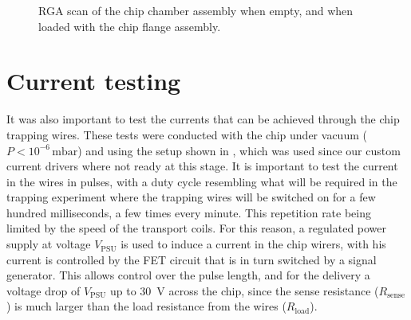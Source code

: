   \begin{figure}[htb]
  \centering
  \caption[RGA scan of empty and full chambers]{
    RGA scan of the chip chamber assembly when empty, and when loaded with the
  chip flange assembly.}
  \label{exper:fig:rga}
\end{figure}


\section{Current testing}
\label{exper:current}

It was also important to test the currents that can be achieved through the
chip trapping wires. These tests were conducted with the chip under vacuum
($P<10^{-6}\,\si{\milli\bar}$) and using the setup shown in
, which was used since our custom current drivers
where not ready at this stage. It is important to test the current in the wires
in pulses, with a duty cycle resembling what will be required in the trapping
experiment where the trapping wires will be switched on for a few hundred
milliseconds, a few times every minute. This repetition rate being limited by
the speed of the transport coils. For this reason, a regulated power supply at
voltage $V_\text{PSU}$ is used to induce a current in the
chip wirers, with his current is controlled by the FET circuit that is in turn
switched by a signal generator. This allows control over the pulse length, and
for the delivery a voltage drop of $V_\text{PSU}$ up to \SI{30}{\volt}
across the chip, since the sense resistance ($R_\text{sense}$) is much larger
than the load resistance from the wires ($R_\text{load}$).


